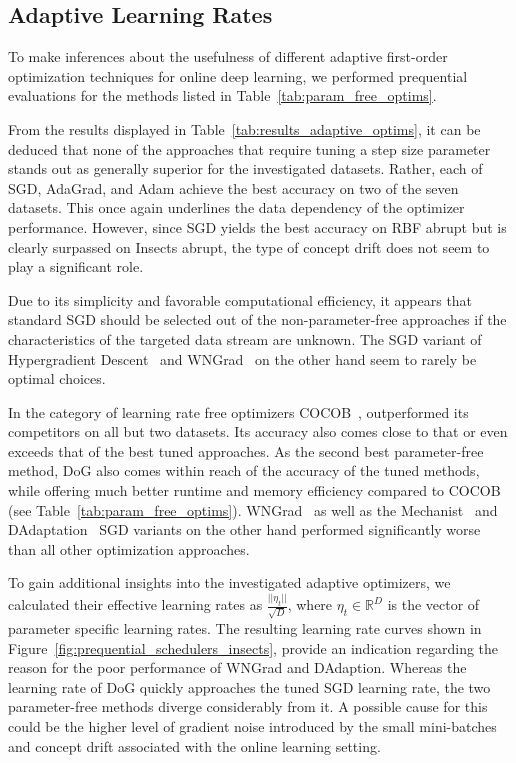 \documentclass[letterpaper]{article} %
\begin{document}
\subsection{Adaptive Learning Rates}

To make inferences about the usefulness of different adaptive first-order optimization techniques for online deep learning, we performed prequential evaluations for the methods listed in Table~\ref{tab:param_free_optims}.

From the results displayed in Table~\ref{tab:results_adaptive_optims}, it can be deduced that none of the approaches that require tuning a step size parameter stands out as generally superior for the investigated datasets.
Rather, each of SGD, AdaGrad, and Adam achieve the best accuracy on two of the seven datasets.  This once again underlines the data dependency of the optimizer performance.
However, since SGD yields the best accuracy on RBF abrupt but is clearly surpassed on Insects abrupt, the type of concept drift does not seem to play a significant role.

Due to its simplicity and favorable computational efficiency, it appears that standard SGD should be selected out of the non-parameter-free approaches if the characteristics of the targeted data stream are unknown.
The SGD variant of Hypergradient Descent~\cite{baydinOnlineLearningRate2018} and WNGrad~\cite{wuWNGradLearnLearning2020} on the other hand seem to rarely be optimal choices.

In the category of learning rate free optimizers COCOB~\cite{orabonaTrainingDeepNetworks2017}, outperformed its competitors on all but two datasets.
Its accuracy also comes close to that or even exceeds that of the best tuned approaches.
As the second best parameter-free method, DoG also comes within reach of the accuracy of the tuned methods, while offering much better runtime and memory efficiency compared to COCOB (see Table~\ref{tab:param_free_optims}).
WNGrad~\cite{wuWNGradLearnLearning2020} as well as the Mechanist~\cite{cutkoskyMechanicLearningRate2023} and DAdaptation~\cite{defazioLearningRateFreeLearningDAdaptation2023a} SGD variants on the other hand performed significantly worse than all other optimization approaches.

To gain additional insights into the investigated adaptive optimizers, we calculated their effective learning rates as $\frac{||\eta_t||}{\sqrt{D}}$, where $\eta_t \in \mathbb{R}^D$ is the vector of parameter specific learning rates.
The resulting learning rate curves shown in Figure~\ref{fig:prequential_schedulers_insects}, provide an indication regarding the reason for the poor performance of WNGrad and DAdaption.
Whereas the learning rate of DoG quickly approaches the tuned SGD learning rate, the two parameter-free methods diverge considerably from it.
A possible cause for this could be the higher level of gradient noise introduced by the small mini-batches and concept drift associated with the online learning setting.
\end{document}
